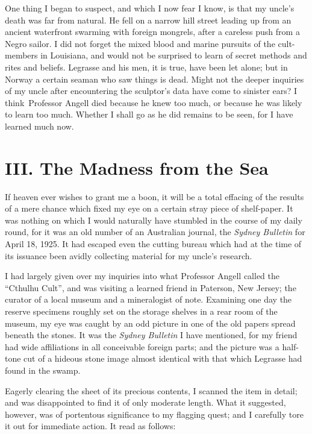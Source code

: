 One thing I began to suspect, and which I now fear I know, is that my
uncle's death was far from natural. He fell on a narrow hill street
leading up from an ancient waterfront swarming with foreign mongrels,
after a careless push from a Negro sailor. I did not forget the mixed
blood and marine pursuits of the cult-members in Louisiana, and would
not be surprised to learn of secret methods and rites and beliefs.
Legrasse and his men, it is true, have been let alone; but in Norway a
certain seaman who saw things is dead. Might not the deeper inquiries of
my uncle after encountering the sculptor's data have come to sinister
ears? I think\est\ Professor Angell died because he knew too much, or because
he was likely to learn too much. Whether I shall go as he did remains to
be seen, for I have learned much now.

\pagebreak

{\let\clearpage\relax\chapter*{III. The Madness from the Sea}}

\noindent{}If heaven ever wishes to grant me a boon, it will be a total effacing of
the results of a mere chance which fixed my eye on a certain stray piece
of shelf-paper. It was nothing on which I would naturally have stumbled
in the course of my daily round, for it was an old number of an
Australian journal, the \emph{Sydney Bulletin} for April 18, 1925. It had
escaped even the cutting bureau which had at the time of its issuance
been avidly collecting material for my uncle's research.

I had largely given over my inquiries into what Professor Angell called
the ``Cthulhu Cult'', and was visiting a learned friend in Paterson, New
Jersey; the curator of a local museum and a mineralogist of note.
Examining one day the reserve specimens roughly set on the storage
shelves in a rear room of the museum, my eye was caught by an odd
picture in one of the old papers spread beneath the stones. It was the
\emph{Sydney Bulletin} I have mentioned, for my friend had wide affiliations in
all conceivable foreign parts; and the picture was a half-tone cut of a
hideous stone image almost identical with that which Legrasse had found
in the swamp.

Eagerly clearing the sheet of its precious contents, I scanned the item
in detail; and was disappointed to find it of only moderate length. What
it suggested, however, was of portentous significance to my flagging
quest; and I carefully tore it out for immediate action. It read as
follows:

